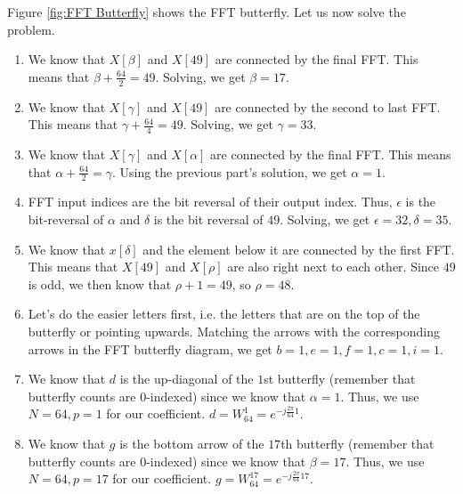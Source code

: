 \documentclass{article}
\begin{document}
Figure \ref{fig:FFT Butterfly} shows the FFT butterfly. Let us now solve the problem.

\begin{enumerate}
    \item We know that $X[\beta]$ and $X[49]$ are connected by the final FFT. This means that $\beta + \frac{64}{2} = 49$. Solving, we get $\boxed{\beta = 17}$.
    
    \item We know that $X[\gamma]$ and $X[49]$ are connected by the second to last FFT. This means that $\gamma + \frac{64}{4} = 49$. Solving, we get $\boxed{\gamma = 33}$.
    
    \item We know that $X[\gamma]$ and $X[\alpha]$ are connected by the final FFT. This means that $\alpha + \frac{64}{2} = \gamma$. Using the previous part's solution, we get $\boxed{\alpha = 1}$.
    
    \item FFT input indices are the bit reversal of their output index. Thus, $\epsilon$ is the bit-reversal of $\alpha$ and $\delta$ is the bit reversal of $49$. Solving, we get $\boxed{\epsilon = 32, \delta = 35}$.
    
    \item We know that $x[\delta]$ and the element below it are connected by the first FFT. This means that $X[49]$ and $X[\rho]$ are also right next to each other. Since $49$ is odd, we then know that $\rho + 1 = 49$, so $\boxed{\rho = 48}$.
    
    \item Let's do the easier letters first, i.e. the letters that are on the top of the butterfly or pointing upwards. Matching the arrows with the corresponding arrows in the FFT butterfly diagram, we get $\boxed{b = 1, e = 1, f = 1, c = 1, i = 1}$.
    
    \item We know that $d$ is the up-diagonal of the $1$st butterfly (remember that butterfly counts are $0$-indexed) since we know that $\alpha = 1$. Thus, we use $N = 64, p = 1$ for our coefficient. $\boxed{d = W_{64}^1 = e^{-j \frac{2\pi}{64} 1}}$.
    
    \item We know that $g$ is the bottom arrow of the $17$th butterfly (remember that butterfly counts are $0$-indexed) since we know that $\beta = 17$. Thus, we use $N = 64, p = 17$ for our coefficient. $\boxed{g = W_{64}^{17} = e^{-j \frac{2\pi}{64} 17}}$.
    

\end{enumerate}
\end{document}
